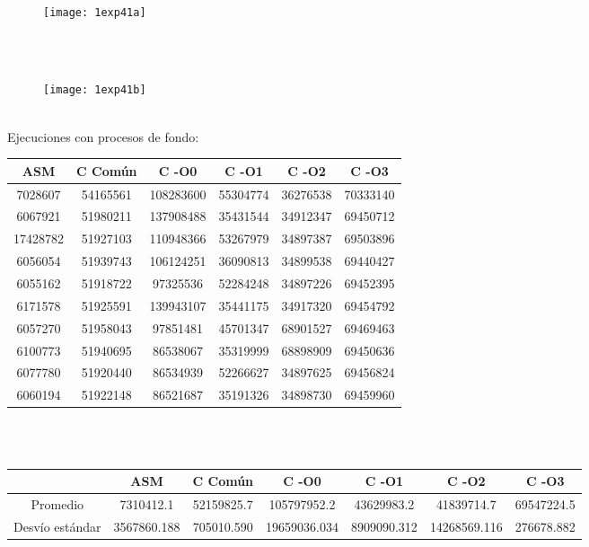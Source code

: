﻿\documentclass[a4paper]{article}
\begin{document}
\ \\
\begin{figure}[H]
  \centering
    \texttt{[image: 1exp41a]}
\end{figure}
\ \\
\ \\
\begin{figure}[H]
  \centering
    \texttt{[image: 1exp41b]}
\end{figure}
\ \\
Ejecuciones con procesos de fondo:
\ \\
\begin{center}
  \begin{tabular}{| c | c | c | c | c | c |}
    \hline
    ASM & C Com\'un &C -O0 & C -O1 & C -O2 & C -O3\\ 
    \hline\hline

7028607 &54165561 & 108283600 &55304774 & 36276538  &70333140\\
\hline
6067921 &51980211 & 137908488 &35431544 & 34912347 & 69450712\\
\hline
17428782  &51927103& 110948366& 53267979 & 34897387 & 69503896\\
\hline
6056054 &51939743 & 106124251& 36090813  &34899538 & 69440427\\
\hline
6055162 &51918722 & 97325536 & 52284248 & 34897226 & 69452395\\
\hline
6171578 &51925591 & 139943107& 35441175 & 34917320 & 69454792\\
\hline
6057270& 51958043 & 97851481 & 45701347 & 68901527 & 69469463\\
\hline
6100773 &51940695 & 86538067 & 35319999 & 68898909 & 69450636\\
\hline
6077780& 51920440 & 86534939 & 52266627 & 34897625 & 69456824\\
\hline
6060194 &51922148 & 86521687 & 35191326 & 34898730 & 69459960\\

  \hline
  \end{tabular}
\end{center}
\ \\
\ \\
\begin{center}
  \begin{tabular}{| c | c | c | c | c | c | c |}
    \hline
      & ASM & C Com\'un& C -O0 & C -O1 & C -O2 & C -O3 \\
      \hline\hline
      Promedio  & 7310412.1& 52159825.7  &105797952.2 &43629983.2 & 41839714.7 & 69547224.5\\
      \hline
      Desvío estándar & 3567860.188 &705010.590 & 19659036.034  &8909090.312 & 14268569.116  &276678.882\\
      \hline
  \end{tabular}
\end{center}
\end{document}
